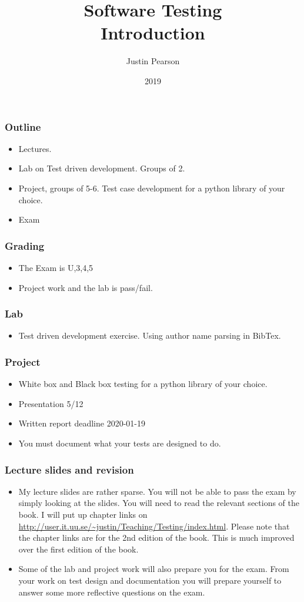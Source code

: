 \documentclass{beamer}
\title{Software Testing \\ Introduction}
\author{Justin Pearson}
\date{2019}
\begin{document}
\lstset{language=python}

\begin{frame}
  \maketitle
\end{frame}
\begin{frame}
  \frametitle{Outline}
  \begin{itemize}
  \item Lectures.
  \item Lab on Test driven development. Groups of 2.
  \item Project, groups of 5-6. Test case development for a python
    library of your choice.
  \item Exam
  \end{itemize}
\end{frame}
\begin{frame}
  \frametitle{Grading}
  \begin{itemize}
  \item The Exam is U,3,4,5
  \item Project work and the lab is pass/fail.
  \end{itemize}
\end{frame}
\begin{frame}
  \frametitle{Lab}
  \begin{itemize}
  \item Test driven development exercise. Using author name parsing in
    BibTex. 
  \end{itemize}
\end{frame}
\begin{frame}
  \frametitle{Project}
  \begin{itemize}
  \item White box and Black box testing for a python library of your choice.
  \item Presentation 5/12
  \item Written report deadline 2020-01-19
  \item You must document what your tests are designed to do.
  \end{itemize}
\end{frame}
\begin{frame}
  \frametitle{Lecture slides and revision}
  \begin{itemize}
  \item My lecture slides are rather sparse. You will not be able to
    pass the exam by simply looking at the slides. You will need to
    read the relevant sections of the book. I will put up chapter
    links on
    \url{http://user.it.uu.se/~justin/Teaching/Testing/index.html}. Please
    note that the chapter links are for the 2nd edition of the
    book. This is much improved over the first edition of the book.
\item Some of the lab and project work will also prepare you for the
  exam. From your work on test design and documentation you will
  prepare yourself to answer some more reflective questions on the exam.
  \end{itemize}
\end{frame}
\end{document}
